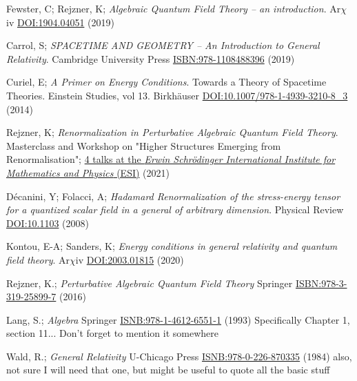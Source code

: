 \documentclass[a4paper,11pt]{article}
\numberwithin{equation}{section}
\theoremstyle{definition}
\begin{document}
\newpage 
\begin{thebibliography}{99}

    Fewster, C; Rejzner, K; \textit{Algebraic Quantum Field Theory -- an introduction}. Ar$\chi$iv \href{https://arxiv.org/abs/1904.04051}{DOI:1904.04051} (2019)

    Carrol, S; \textit{SPACETIME AND GEOMETRY -- An Introduction to General Relativity}. Cambridge University Press \href{https://www.cambridge.org/highereducation/books/spacetime-and-geometry/38EDABF9E2BADCE6FBCF2B22DC12BFFE#overview}{ISBN:978-1108488396} (2019)

    Curiel, E; \textit{A Primer on Energy Conditions}. Towards a Theory of Spacetime Theories. Einstein Studies, vol 13. Birkhäuser \href{https://arxiv.org/abs/1405.0403}{DOI:10.1007/978-1-4939-3210-8\_3} (2014)

    Rejzner, K; \textit{Renormalization in Perturbative Algebraic Quantum Field Theory}. Masterclass and Workshop on "Higher Structures Emerging from Renormalisation"; \href{https://www.youtube.com/watch?v=3JVDJhFpuPY&ab_channel=ErwinSchr%C3%B6dingerInternationalInstituteforMathematicsandPhysics%28ESI%29}{4 talks at the \textit{Erwin Schrödinger International Institute for Mathematics and Physics} (ESI)} (2021)

    Décanini, Y; Folacci, A; \textit{Hadamard Renormalization of the stress-energy tensor for a quantized scalar field in a general of arbitrary dimension}. Physical Review \href{https://arxiv.org/abs/gr-qc/0512118}{DOI:10.1103} (2008)

     Kontou, E-A; Sanders, K; \textit{Energy conditions in general relativity and quantum field theory}. Ar$\chi$iv \href{https://arxiv.org/abs/2003.01815}{DOI:2003.01815} (2020)

    Rejzner, K.; \textit{Perturbative Algebraic Quantum Field Theory} Springer \href{https://link.springer.com/book/10.1007/978-3-319-25901-7}{ISBN:978-3-319-25899-7} (2016)

    Lang, S.; \textit{Algebra} Springer \href{https://link.springer.com/book/10.1007/978-1-4613-0041-0}{ISNB:978-1-4612-6551-1} (1993) \color{red} Specifically Chapter 1, section 11... Don't forget to mention it somewhere\color{black}

    Wald, R.; \textit{General Relativity} U-Chicago Press \href{https://press.uchicago.edu/ucp/books/book/chicago/G/bo5952261.html}{ISNB:978-0-226-870335} (1984) \color{red}also, not sure I will need that one, but might be useful to quote all the basic stuff\color{black}
\end{thebibliography} 
\end{document}
